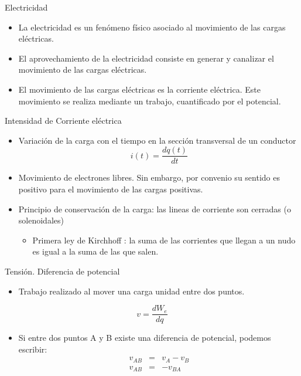 \documentclass[xcolor={usenames,svgnames,dvipsnames}]{beamer}
\begin{document}
\begin{frame}[label={sec:org07e7d56}]{Electricidad}
\begin{itemize}
\item La electricidad es un fenómeno físico asociado al \alert{movimiento de las
cargas eléctricas}.

\item El aprovechamiento de la electricidad consiste en generar y canalizar
el movimiento de las cargas eléctricas.

\item El movimiento de las cargas eléctricas es la \alert{corriente eléctrica}.
Este movimiento se realiza mediante un trabajo, cuantificado por el
\alert{potencial}.
\end{itemize}
\end{frame}

\begin{frame}[label={sec:org4167732}]{Intensidad de Corriente eléctrica}
\begin{itemize}
\item \alert{Variación de la carga con el tiempo en la sección transversal de un
conductor} $$i(t)=\frac{dq(t)}{dt}$$

\item Movimiento de electrones libres. Sin embargo, por convenio su sentido
es positivo para el movimiento de las cargas positivas.

\item \alert{Principio de conservación de la carga}: las lineas de corriente son
cerradas (o solenoidales)

\begin{itemize}
\item Primera ley de Kirchhoff : la suma de las corrientes que llegan a
un nudo es igual a la suma de las que salen.
\end{itemize}
\end{itemize}
\end{frame}

\begin{frame}[label={sec:org6349c76}]{Tensión. Diferencia de potencial}
\begin{itemize}
\item \alert{Trabajo realizado al mover una carga unidad entre dos puntos}.
\end{itemize}

$$v=\frac{dW_{e}}{dq}$$

\begin{itemize}
\item Si entre dos puntos A y B existe una diferencia de potencial, podemos
escribir: $$\begin{aligned}
         v_{AB} & = & v_{A}-v_{B}\\
         v_{AB} & = & -v_{BA}
       \end{aligned}$$
\end{itemize}
\end{frame}
\end{document}
